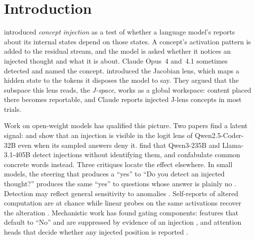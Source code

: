 \documentclass[11pt]{article}
\begin{document}
\begin{abstract}
A 256-token chain of thought lowers detection AUROC at every size (14B: 0.93 to 0.82). It fills 90--97\% of the traces with capability disclaimers and does not improve naming.

An exploratory study of deliberate gibberish finds a goal direction specific to the instruction. The direction sustains the behaviour but does not suppress meaning.

In these models, reports of injected thoughts run mainly through a content-free yes direction at a late bottleneck. The injected content is present at that point, but the reports almost never identify it.
\end{abstract}

\section{Introduction}

\citet{lindsey2025introspection} introduced \emph{concept injection} as a test of whether a language model's reports about its internal states depend on those states. A concept's activation pattern is added to the residual stream, and the model is asked whether it notices an injected thought and what it is about. Claude Opus~4 and~4.1 sometimes detected and named the concept. \citet{gurnee2026workspace} introduced the Jacobian lens, which maps a hidden state to the tokens it disposes the model to say. They argued that the subspace this lens reads, the \emph{J-space}, works as a global workspace: content placed there becomes reportable, and Claude reports injected J-lens concepts in most trials.

Work on open-weight models has qualified this picture. Two papers find a latent signal: \citet{vogel2025small} and \citet{pearsonvogel2026latent} show that an injection is visible in the logit lens of Qwen2.5-Coder-32B even when its sampled answers deny it. \citet{lederman2026content} find that Qwen3-235B and Llama-3.1-405B detect injections without identifying them, and confabulate common concrete words instead. Three critiques locate the effect elsewhere. In small models, the steering that produces a ``yes'' to ``Do you detect an injected thought?'' produces the same ``yes'' to questions whose answer is plainly no \citep{godet2025confusion,hahami2026disturbance,hahami2026ift}. Detection may reflect general sensitivity to anomalies \citep{singh2026reality}. Self-reports of altered computation are at chance while linear probes on the same activations recover the alteration \citep{ferrara2026owmi}. Mechanistic work has found gating components: features that default to ``No'' and are suppressed by evidence of an injection \citep{macar2026mechanisms}, and attention heads that decide whether any injected position is reported \citep{zou2026mechanistic}.
\end{document}
